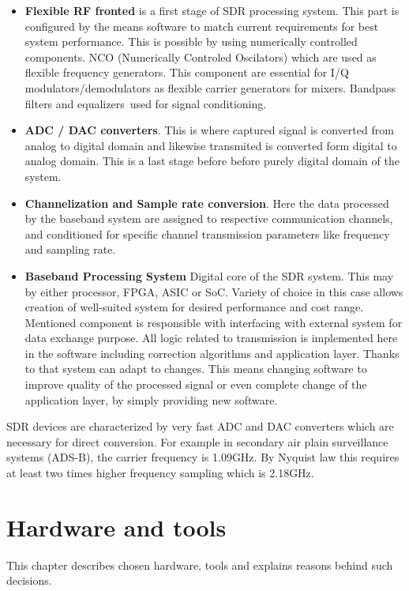 \documentclass[en,printmode]{mgr}
\begin{document}
		\begin{itemize}
			\item \textbf{Flexible RF fronted} is a first stage of SDR processing system. This part is configured by the means
			software to match current requirements for best system performance. This is possible by using numerically
			controlled components.
			NCO (Numerically Controled Oscilators) which are used as flexible frequency generators. This component are
			essential for I/Q modulators/demodulators as flexible carrier generators for mixers. Bandpass filters and equalizers\
			used for signal conditioning.
			
			\item \textbf{ADC / DAC converters}. This is where captured signal is converted from analog to digital domain and
			likewise transmited is converted form digital to analog domain. This is a last stage before before purely digital 
			domain of the system.
			
			\item \textbf{Channelization and Sample rate conversion}. Here the data processed by the baseband system are assigned
			to respective communication channels, and conditioned for specific channel transmission parameters like frequency and
			sampling rate.
			
			\item \textbf{Baseband Processing System} Digital core of the SDR system. This may by either processor, FPGA, ASIC or
			SoC. Variety of choice in this case allows creation of well-suited system for desired performance and cost range. 
			Mentioned component is responsible with interfacing with external system for data exchange purpose. All logic related to
			transmission is implemented here in the software including correction algorithms and application layer. Thanks to that
			system can adapt to changes. This means changing software to improve quality of the processed signal
			or even complete change of the application layer, by simply providing new software.
		\end{itemize}
		
		SDR devices are characterized by very fast ADC and DAC converters which are necessary for 
		direct conversion. For example in secondary air plain surveillance systems (ADS-B), the
	    carrier frequency is 1.09GHz. By Nyquist law this requires at least two times higher frequency
	    sampling which is 2.18GHz.
	    
\chapter{Hardware and tools}
	This chapter describes chosen hardware, tools and explains reasons behind such decisions.
\end{document}
